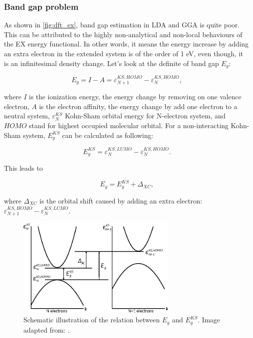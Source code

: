 \subsubsection{Band gap problem}

As shown in \autoref{fig:dft_ex}, band gap estimation in LDA and GGA is quite poor. This can be attributed to the highly non-analytical and non-local behaviours of the EX energy functional. In other words, it means the energy increase by adding an extra electron in the extended system is of the order of 1 eV, even though, it is an infinitesimal density change. Let's look at the definite of band gap $E_{g}$:

\begin{equation}
E_{g}=I-A=\varepsilon_{N+1}^{KS,HOMO}-\varepsilon_N^{KS,HOMO},
\end{equation}

where $I$ is the ionization energy, the energy change by removing on one valence electron, $A$ is the electron affinity, the energy change by add one electron to a neutral system, $\varepsilon_N^{KS}$ Kohn-Sham orbital energy for N-electron system, and $HOMO$ stand for highest occupied molecular orbital. For a non-interacting Kohn-Sham system, $E_{g}^{KS}$ can be calculated as following:

\begin{equation}
E_{g}^{KS}=\varepsilon_{N}^{KS,LUMO}-\varepsilon_{N}^{KS,HOMO}.
\end{equation}

This leads to 

\begin{equation}
E_{g}=E_{g}^{KS}+\Delta_{XC},
\end{equation}

where $\Delta_{XC}$ is the orbital shift caused by adding an extra electron: $\varepsilon_{N+1}^{KS,HOMO}-\varepsilon_{N}^{KS,LUMO}$.

\begin{figure}[htbp!] 
\centering  
\includegraphics[width=0.7\textwidth]{Eg.eps}
\caption{ Schematic illustration of the relation between $E_g$ and $E^{KS}_g$. Image adapted from: \cite{fiolhais2008primer}.}  
\label{fig:dft_eg}
\end{figure} 


